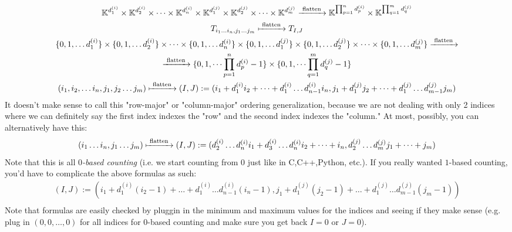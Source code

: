 \documentclass[10pt]{amsart}
\begin{document}
\begin{multicols*}{2}
\begin{equation}
\begin{gathered}
	\mathbb{K}^{d_1^{(i)} } \times \mathbb{K}^{d_2^{(i)} } \times \dots \times \mathbb{K}^{d_n^{(i)} } \times \mathbb{K}^{d_1^{(j)} } \times \mathbb{K}^{d_2^{(j)} } \times \dots \times \mathbb{K}^{d_m^{(j)} } \xrightarrow{ \text{ flatten } } \mathbb{K}^{ \prod_{p=1}^n d_p^{(i)} } \times \mathbb{K}^{ \prod_{q=1}^m d_q^{(j)} }   \\
T_{i_1 \dots i_n, j_1 \dots j_m } \xmapsto{ \text{ flatten } } T_{I,J}   \\
\lbrace 0 ,1, \dots d_1^{(i)} \rbrace \times \lbrace 0 ,1, \dots d_2^{(i)} \rbrace \times \dots \times \lbrace 0 ,1, \dots d_n^{(i)} \rbrace \times \lbrace 0 ,1, \dots d_1^{(j)} \rbrace \times \lbrace 0 ,1, \dots d_2^{(j)} \rbrace \times \dots \times \lbrace 0 ,1, \dots d_m^{(j)} \rbrace \xrightarrow{ \text{ flatten } } \\
\xrightarrow{ \text{ flatten } }  \lbrace 0 ,1, \dots  \prod_{p=1}^n d_p^{(i)} -1 \rbrace \times \lbrace 0 ,1, \dots \prod_{q=1}^m d_q^{(j)} - 1 \rbrace  \\
(i_1,i_2, \dots i_n, j_1,j_2 \dots j_m ) \xmapsto{ \text{ flatten } } (I,J) := (i_1 + d_1^{(i)} i_2 + \dots + d_1^{(i)} \dots d_{n-1}^{(i)} i_n ,j_1 + d_1^{(j)} j_2 + \dots + d_1^{(j)} \dots d_{m-1}^{(j)} j_m ) \\ 
\end{gathered}
\end{equation}
It doesn't make sense to call this "row-major" or "column-major" ordering generalization, because we are not dealing with only 2 indices where we can definitely say the first index indexes the "row" and the second index indexes the "column."  At most, possibly, you can alternatively have this:
\[
(i_1 \dots i_n,j_1\dots j_m) \xmapsto{ \text{ flatten } } (I,J) := (d_2^{(i)} \dots d_n^{(i)}i_1 + d_3^{(i)} \dots d_n^{(i)} i_2 + \dots + i_n , d_2^{(j)} \dots d_m^{(j)} j_1 + \dots + j_m )
\]
Note that this is all \emph{$0$-based counting} (i.e. we start counting from $0$ just like in C,C++,Python, etc.).  If you really wanted $1$-based counting, you'd have to complicate the above formulas as such:
\[
\begin{gathered}
(I,J) := (i_1 + d_1^{(i)} (i_2-1) + \dots + d_1^{(i)} \dots d_{n-1}^{(i)} (i_n-1) ,j_1 + d_1^{(j)} (j_2-1) + \dots + d_1^{(j)} \dots d_{m-1}^{(j)} (j_m-1) ) \\ 
\end{gathered}
\]
Note that formulas are easily checked by pluggin in the minimum and maximum values for the indices and seeing if they make sense (e.g. plug in $(0,0,\dots ,0)$ for all indices for $0$-based counting and make sure you get back $I=0$ or $J=0$).  


\end{multicols*}
\end{document}
